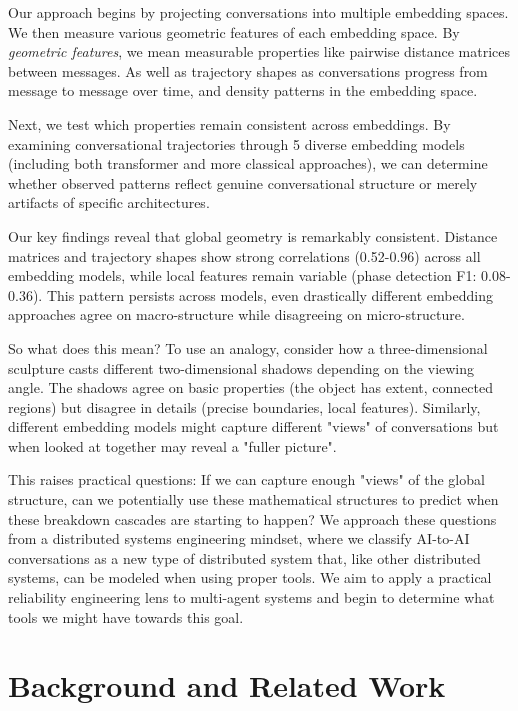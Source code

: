 \documentclass[11pt,letterpaper]{article}
\newcommand{\numEmbeddingModels}{5}
\begin{document}
Our approach begins by projecting conversations into multiple embedding spaces. We then measure various geometric features of each embedding space. By \textit{geometric features}, we mean measurable properties like pairwise distance matrices between messages. As well as trajectory shapes as conversations progress from message to message over time, and density patterns in the embedding space.

Next, we test which properties remain consistent across embeddings. By examining conversational trajectories through \numEmbeddingModels{} diverse embedding models (including both transformer and more classical approaches), we can determine whether observed patterns reflect genuine conversational structure or merely artifacts of specific architectures.

Our key findings reveal that global geometry is remarkably consistent. Distance matrices and trajectory shapes show strong correlations (0.52-0.96) across all embedding models, while local features remain variable (phase detection F1: 0.08-0.36). This pattern persists across models, even drastically different embedding approaches agree on macro-structure while disagreeing on micro-structure.

So what does this mean? To use an analogy, consider how a three-dimensional sculpture casts different two-dimensional shadows depending on the viewing angle. The shadows agree on basic properties (the object has extent, connected regions) but disagree in details (precise boundaries, local features). Similarly, different embedding models might capture different "views" of conversations but when looked at together may reveal a "fuller picture".

This raises practical questions: If we can capture enough "views" of the global structure, can we potentially use these mathematical structures to predict when these breakdown cascades are starting to happen? We approach these questions from a distributed systems engineering mindset, where we classify AI-to-AI conversations as a new type of distributed system that, like other distributed systems, can be modeled when using proper tools. We aim to apply a practical reliability engineering lens to multi-agent systems and begin to determine what tools we might have towards this goal. 


\section{Background and Related Work}
\end{document}
